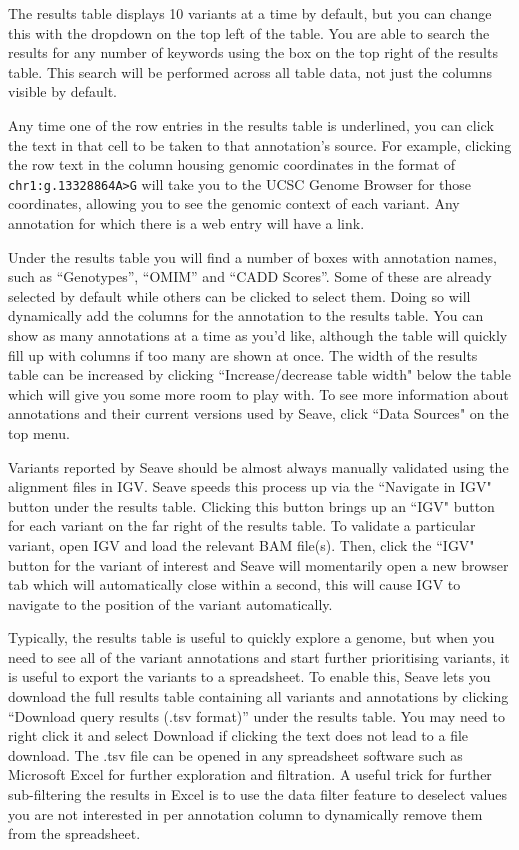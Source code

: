 \documentclass[11pt, a4paper]{article}
\begin{document}
The results table displays 10 variants at a time by default, but you can change this with the dropdown on the top left of the table. You are able to search the results for any number of keywords using the box on the top right of the results table. This search will be performed across all table data, not just the columns visible by default.

Any time one of the row entries in the results table is underlined, you can click the text in that cell to be taken to that annotation's source. For example, clicking the row text in the column housing genomic coordinates in the format of \texttt{chr1:g.13328864A>G} will take you to the UCSC Genome Browser for those coordinates, allowing you to see the genomic context of each variant. Any annotation for which there is a web entry will have a link.

Under the results table you will find a number of boxes with annotation names, such as ``Genotypes'', ``OMIM'' and ``CADD Scores''. Some of these are already selected by default while others can be clicked to select them. Doing so will dynamically add the columns for the annotation to the results table. You can show as many annotations at a time as you'd like, although the table will quickly fill up with columns if too many are shown at once. The width of the results table can be increased by clicking ``Increase/decrease table width" below the table which will give you some more room to play with. To see more information about annotations and their current versions used by Seave, click ``Data Sources" on the top menu.

Variants reported by Seave should be almost always manually validated using the alignment files in IGV. Seave speeds this process up via the ``Navigate in IGV" button under the results table. Clicking this button brings up an ``IGV" button for each variant on the far right of the results table. To validate a particular variant, open IGV and load the relevant BAM file(s). Then, click the ``IGV" button for the variant of interest and Seave will momentarily open a new browser tab which will automatically close within a second, this will cause IGV to navigate to the position of the variant automatically.

Typically, the results table is useful to quickly explore a genome, but when you need to see all of the variant annotations and start further prioritising variants, it is useful to export the variants to a spreadsheet. To enable this, Seave lets you download the full results table containing all variants and annotations by clicking ``Download query results (.tsv format)'' under the results table. You may need to right click it and select Download if clicking the text does not lead to a file download. The .tsv file can be opened in any spreadsheet software such as Microsoft Excel for further exploration and filtration. A useful trick for further sub-filtering the results in Excel is to use the data filter feature to deselect values you are not interested in per annotation column to dynamically remove them from the spreadsheet.
\end{document}
